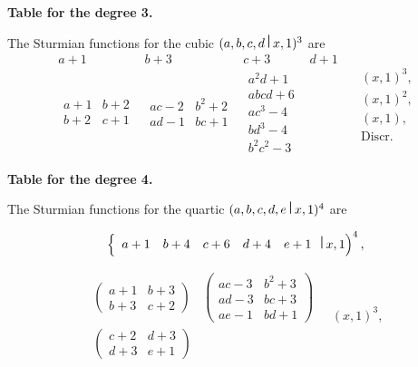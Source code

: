 \documentclass[12pt,a4paper]{article}
\theoremstyle{definition}
\begin{document}
\bigskip
\noindent\textbf{Table for the degree 3.}

The Sturmian functions for the cubic $(a,b,c,d\,\raisebox{0.5ex}{\textbf{\textbar}}\,x,1)^3$ are
\[
\begin{array}{c|c|c|c}
a+1 & b+3 & c+3 & d+1 \\ \hline
\begin{array}{cc} a+1 & b+2 \\ b+2 & c+1 \end{array} &
\begin{array}{cc} ac-2 & b^2+2 \\ ad-1 & bc+1 \end{array} &
\begin{array}{c} a^2d+1 \\ abcd+6 \\ ac^3-4 \\ bd^3-4 \\ b^2c^2-3 \end{array}
\end{array}
\quad
\begin{array}{c}
(x,1)^3, \\
(x,1)^2, \\
(x,1), \\
\text{Discr.}
\end{array}
\]

\newpage
\noindent\textbf{Table for the degree 4.}

The Sturmian functions for the quartic $(a,b,c,d,e\,\raisebox{0.5ex}{\textbf{\textbar}}\,x,1)^4$ are

\[
\left\{
\begin{array}{ccccc}
a+1 & b+4 & c+6 & d+4 & e+1
\end{array}
\,\raisebox{0.5ex}{\textbf{\textbar}}\,x,1\right)^4,
\]

\[
\begin{array}{cc}
\begin{pmatrix}
a+1 & b+3 \\
b+3 & c+2
\end{pmatrix} &
\begin{pmatrix}
ac-3 & b^2+3 \\
ad-3 & bc+3 \\
ae-1 & bd+1
\end{pmatrix} \\
\begin{pmatrix}
c+2 & d+3 \\
d+3 & e+1
\end{pmatrix}
\end{array}
\quad
(x,1)^3,
\]
\end{document}
